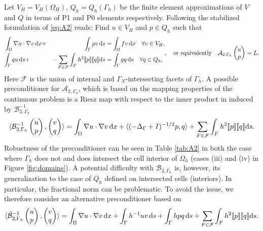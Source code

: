 Let $V_H=V_H(\Omega_H)$, $Q_h=Q_h(\Gamma_h)$ be the finite element approximations
of $V$ and $Q$ in terms of P1 and P0 elements respectively. Following \cite{burman2014projection}
the stabilized formulation of \eqref{eq:A2} reads: Find $u \in V_H$ and
$p \in Q_h$ such that
%
\[
\begin{aligned}
  &\int_{\Omega}\nabla u\cdot\nabla v\,\mathrm{d}x + &{\int_{\Gamma}p v\,\mathrm{d}s} &= \int_{\Omega}f v\,\mathrm{d}x\quad\forall v\in V_H,\\
  &{\int_{\Gamma}q u\,\mathrm{d}s} + &-\sum_{F\in\mathcal{F}}\int_{F}h^2[\![p]\!][\![q]\!] \mathrm{d}s &= \int_{\Gamma}g q\,\mathrm{d}s\quad\forall q\in Q_h,\\
\end{aligned},
\quad\mbox{or equivalently}\quad
\mathcal{A}_{2, \Gamma_h}\begin{pmatrix}u\\p\\\end{pmatrix} = L.
\]
%
Here $\mathcal{F}$ is the union of internal and $\Gamma_N$-intersecting
facets of $\Gamma_h$. A possible preconditioner for $\mathcal{A}_{2,\Gamma_h}$,
which is based on the mapping properties of the continuous problem is a Riesz
map with respect to the inner product in induced by $\mathcal{B}^{-1}_{2, \Gamma_h}$
\[
\langle
\mathcal{B}^{-1}_{2, \Gamma_h}\begin{pmatrix}u\\p\end{pmatrix},
  \begin{pmatrix}v\\q\end{pmatrix}
\rangle
    =
    \int_{\Omega}\nabla u\cdot\nabla v\,\mathrm{d}x + \langle(-\Delta_{\Gamma}+I)^{-1/2}p, q\rangle
    + \sum_{F\in\mathcal{F}}\int_{F}h^2[\![p]\!][\![q]\!] \mathrm{d}s.
\]
Robustness of the preconditioner can be seen in Table \ref{tab:A2} in both
the case where $\Gamma_h$ does not and does intersect the cell interior of $\Omega_h$ (cases
(iii) and (iv) in Figure \ref{fig:domains}). A potential difficulty with
$\mathcal{B}_{2, \Gamma_h}$ is, however, its generalization to the case of $Q_h$ defined
on intersected cells (interiors). In particular, the fractional norm can be
problematic. To avoid the issue, we therefore consider an alternative
preconditioner based on \cite[\S 4.A]{burman2014projection}
\[
\langle
\tilde{\mathcal{B}}^{-1}_{2, \Gamma_h}\begin{pmatrix}u\\p\end{pmatrix},
  \begin{pmatrix}v\\q\end{pmatrix}
\rangle
    =
    \int_{\Omega}\nabla u\cdot\nabla v\,\mathrm{d}x + \int_{\Gamma}h^{-1}u v\,\mathrm{d}s + \int_{\Gamma} h p q\,\mathrm{d}s
    + \sum_{F\in\mathcal{F}}\int_{F}h^2[\![p]\!][\![q]\!] \mathrm{d}s.
\]
